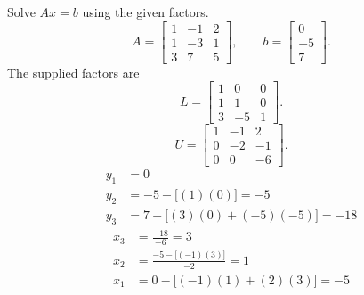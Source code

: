 \goal Solve $Ax=b$ using the given factors.
\[A=\left[\begin{matrix}1 & -1 & 2\\1 & -3 & 1\\3 & 7 & 5\end{matrix}\right],\qquad b=\left[\begin{matrix}0\\-5\\7\end{matrix}\right].\]
The supplied factors are
\[L=\left[\begin{matrix}1 & 0 & 0\\1 & 1 & 0\\3 & -5 & 1\end{matrix}\right].\]
\[U=\left[\begin{matrix}1 & -1 & 2\\0 & -2 & -1\\0 & 0 & -6\end{matrix}\right].\]
\begin{align*}y_{1}&=0\\
y_{2}&=-5-\bigl[(1)(0)\bigr]=-5\\
y_{3}&=7-\bigl[(3)(0)+(-5)(-5)\bigr]=-18\end{align*}
\begin{align*}x_{3}&=\frac{-18}{-6}=3\\
x_{2}&=\frac{-5-\bigl[(-1)(3)\bigr]}{-2}=1\\
x_{1}&=0-\bigl[(-1)(1)+(2)(3)\bigr]=-5\end{align*}

